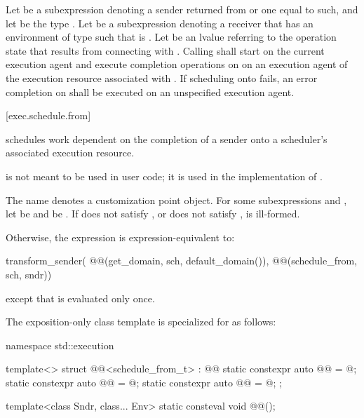 \pnum
Let  be a subexpression denoting
a sender returned from  or one equal to such, and
let  be the type .
Let  be a subexpression denoting a receiver
that has an environment of type 
such that  is .
Let  be an lvalue referring to the operation state
that results from connecting  with .
Calling  shall
start  on the current execution agent and
execute completion operations on 
on an execution agent of the execution resource associated with .
If scheduling onto  fails,
an error completion on  shall be executed
on an unspecified execution agent.

[exec.schedule.from]{}

\pnum
{} schedules work dependent on the completion of a sender
onto a scheduler's associated execution resource.
\begin{note}
 is not meant to be used in user code;
it is used in the implementation of .
\end{note}

\pnum
The name  denotes a customization point object.
For some subexpressions  and ,
let  be  and
 be .
If  does not satisfy , or
 does not satisfy ,
 is ill-formed.

\pnum
Otherwise,
the expression  is expression-equivalent to:
\begin{codeblock}
transform_sender(
  @@(get_domain, sch, default_domain()),
  @@(schedule_from, sch, sndr))
\end{codeblock}
except that  is evaluated only once.

\pnum
The exposition-only class template 
is specialized for  as follows:
%
\begin{codeblock}
namespace std::execution {
  template<>
  struct @@<schedule_from_t> : @@ {
    static constexpr auto @@ = @\seebelow@;
    static constexpr auto @@ = @\seebelow@;
    static constexpr auto @@ = @\seebelow@;
  };

  template<class Sndr, class... Env>
    static consteval void @@();
}
\end{codeblock}


